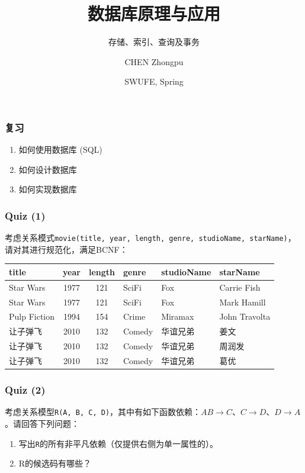 \documentclass[aspectratio=169, 14pt]{beamer}
\title[Database Principles and Applications] %
{数据库原理与应用}
\subtitle{存储、索引、查询及事务}
\author[CHEN Zhongpu] %
{CHEN Zhongpu}
\institute[] %
{
  School of Computing and Artificial Intelligence \\
  \href{mailto:zpchen@swufe.edu.cn}{zpchen@swufe.edu.cn}
}
\date[] %
{SWUFE, Spring \the\year{}}
\begin{document}
\frame{\titlepage}

\begin{frame}
	\frametitle{复习}
	\begin{center}
		\LARGE {}
	\end{center}
	\begin{enumerate}
		\item 如何使用数据库 (SQL)
		\item 如何设计数据库
		\item \alert{如何实现数据库}
	\end{enumerate}

\end{frame}

\begin{frame}
	\frametitle{Quiz (1)}

	考虑关系模式\texttt{movie(title, year, length, genre, studioName, starName)}，请对其进行规范化，满足BCNF：

	\begin{tabular}{|l|c|c|l|l|l|}
		\hline
		title        & year & length & genre  & studioName & starName      \\
		\hline
		Star Wars    & 1977 & 121    & SciFi  & Fox        & Carrie Fish   \\
		Star Wars    & 1977 & 121    & SciFi  & Fox        & Mark Hamill   \\
		Pulp Fiction & 1994 & 154    & Crime  & Miramax    & John Travolta \\
		让子弹飞         & 2010 & 132    & Comedy & 华谊兄弟       & 姜文            \\
		让子弹飞         & 2010 & 132    & Comedy & 华谊兄弟       & 周润发           \\
		让子弹飞         & 2010 & 132    & Comedy & 华谊兄弟       & 葛优            \\
		\hline
	\end{tabular}

\end{frame}

\begin{frame}[fragile]
	\frametitle{Quiz (2)}

	考虑关系模型\texttt{R(A, B, C, D)}，其中有如下函数依赖：$AB \rightarrow C$、$C \rightarrow D$、$D \rightarrow A$。请回答下列问题：

	\begin{enumerate}
		\item 写出\texttt{R}的所有非平凡依赖（仅提供右侧为单一属性的）。
		\item R的候选码有哪些？
	\end{enumerate}
\end{frame}
\end{document}
